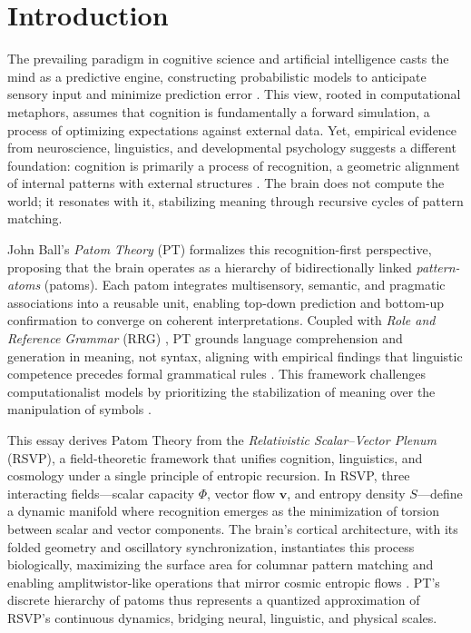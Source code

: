 \documentclass[11pt]{article}
\begin{document}
\section{Introduction}
The prevailing paradigm in cognitive science and artificial intelligence casts the mind as a predictive engine, constructing probabilistic models to anticipate sensory input and minimize prediction error \citep{clark2013whatever, friston2010free}. This view, rooted in computational metaphors, assumes that cognition is fundamentally a forward simulation, a process of optimizing expectations against external data. Yet, empirical evidence from neuroscience, linguistics, and developmental psychology suggests a different foundation: cognition is primarily a process of recognition, a geometric alignment of internal patterns with external structures \citep{gibson1979ecological, piaget1980thinking, jackendoff2012semantics}. The brain does not compute the world; it resonates with it, stabilizing meaning through recursive cycles of pattern matching.

John Ball’s \textit{Patom Theory} (PT) \citep{ball2020patom} formalizes this recognition-first perspective, proposing that the brain operates as a hierarchy of bidirectionally linked \textit{pattern-atoms} (patoms). Each patom integrates multisensory, semantic, and pragmatic associations into a reusable unit, enabling top-down prediction and bottom-up confirmation to converge on coherent interpretations. Coupled with \textit{Role and Reference Grammar} (RRG) \citep{vanvalin2005exploring, vanvalin1997syntax}, PT grounds language comprehension and generation in meaning, not syntax, aligning with empirical findings that linguistic competence precedes formal grammatical rules \citep{pustejovsky1996qualia, lobner2013semantics}. This framework challenges computationalist models by prioritizing the stabilization of meaning over the manipulation of symbols \citep{ball2015speech, pinker2005computational}.

This essay derives Patom Theory from the \textit{Relativistic Scalar--Vector Plenum} (RSVP), a field-theoretic framework that unifies cognition, linguistics, and cosmology under a single principle of entropic recursion. In RSVP, three interacting fields---scalar capacity $\Phi$, vector flow $\mathbf{v}$, and entropy density $S$---define a dynamic manifold where recognition emerges as the minimization of torsion between scalar and vector components. The brain’s cortical architecture, with its folded geometry and oscillatory synchronization, instantiates this process biologically, maximizing the surface area for columnar pattern matching and enabling amplitwistor-like operations that mirror cosmic entropic flows \citep{seung2012connectome, hoffman1998visual}. PT’s discrete hierarchy of patoms thus represents a quantized approximation of RSVP’s continuous dynamics, bridging neural, linguistic, and physical scales.
\end{document}
